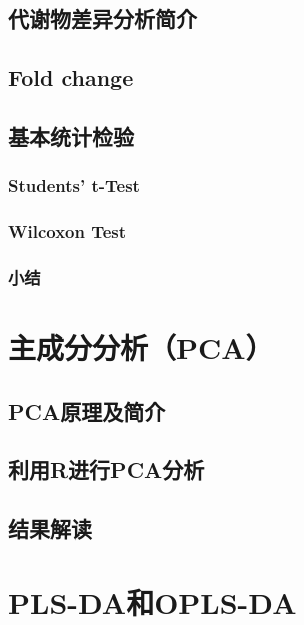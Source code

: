 \documentclass[]{ctexbook}
\begin{document}
\section{代谢物差异分析简介}

\hypertarget{fold-change}{%
\section{Fold change}\label{fold-change}}

\section{基本统计检验}

\hypertarget{students-t-test}{%
\subsection{Students' t-Test}\label{students-t-test}}

\hypertarget{wilcoxon-test}{%
\subsection{Wilcoxon Test}\label{wilcoxon-test}}

\hypertarget{-2}{%
\subsection{小结}\label{-2}}

\hypertarget{chapPCA}{%
\chapter{主成分分析（PCA）}\label{chapPCA}}

\hypertarget{pca}{%
\section{PCA原理及简介}\label{pca}}

\hypertarget{rpca}{%
\section{利用R进行PCA分析}\label{rpca}}

\section{结果解读}

\hypertarget{chapPLS}{%
\chapter{PLS-DA和OPLS-DA}\label{chapPLS}}
\end{document}
